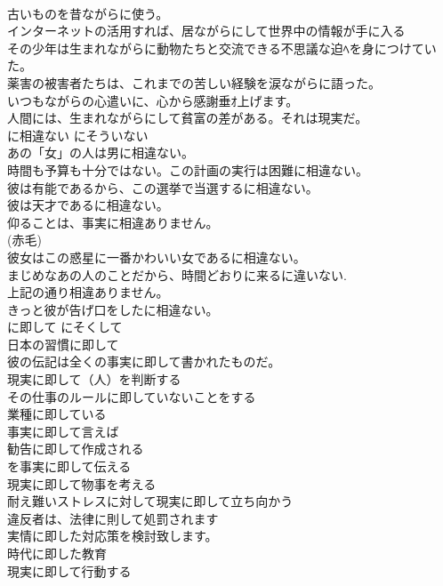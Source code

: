 \documentclass[8pt]{extreport}
\begin{document}
\begin{CJK}{UTF8}{min}
\\	古いものを昔ながらに使う。  
\\	インターネットの活用すれば、居ながらにして世界中の情報が手に入る   
\\	その少年は生まれながらに動物たちと交流できる不思議な迫ﾍを身につけていた。   
\\	薬害の被害者たちは、これまでの苦しい経験を涙ながらに語った。  
\\	いつもながらの心遣いに、心から感謝垂ｵ上げます。  
\\	人間には、生まれながらにして貧富の差がある。それは現実だ。   
\\	に相違ない	にそういない	
\\	あの「女」の人は男に相違ない。   
\\	時間も予算も十分ではない。この計画の実行は困難に相違ない。  
\\	彼は有能であるから、この選挙で当選するに相違ない。  
\\	彼は天才であるに相違ない。  
\\	仰ることは、事実に相違ありません。  
\\	(赤毛)
\\	彼女はこの惑星に一番かわいい女であるに相違ない。  
\\	まじめなあの人のことだから、時間どおりに来るに違いない.  
\\	上記の通り相違ありません。   
\\	きっと彼が告げ口をしたに相違ない。   
\\	に即して	にそくして	
\\	日本の習慣に即して  
\\	彼の伝記は全くの事実に即して書かれたものだ。  
\\	現実に即して（人）を判断する   
\\	その仕事のルールに即していないことをする   
\\	業種に即している   
\\	事実に即して言えば   
\\	勧告に即して作成される   
\\	を事実に即して伝える   
\\	現実に即して物事を考える   
\\	耐え難いストレスに対して現実に即して立ち向かう   
\\	違反者は、法律に則して処罰されます  
\\	実情に即した対応策を検討致します。  
\\	時代に即した教育  
\\	現実に即して行動する   

\end{CJK}
\end{document}
